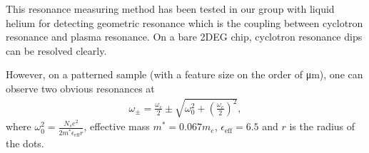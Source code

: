 \documentclass[12pt]{ruthesis}
\begin{document}
This resonance measuring method has been tested in our group with liquid helium for detecting geometric resonance which is the coupling between cyclotron resonance and plasma resonance. 
On a bare 2DEG chip, cyclotron resonance dips can be resolved clearly.


However, on a patterned sample (with a feature size on the order of \si{\micro\meter}), one can observe two obvious resonances at
\begin{align}
\omega_{\pm}=\frac{\omega_{c}}{2} \pm \sqrt{ \omega_{0}^{2}+ \left(\frac{ \omega_{c} }{2}\right)^{2}},
\end{align}
where $\displaystyle \omega_{0}^{2}=\frac{N_{s}e^{2}}{2m^{\ast}\epsilon_{\mathrm{eff}}r}$, effective mass $m^{*}=0.067m_{e}$, $\epsilon_{\mathrm{eff}}=6.5$ and $r$ is the radius of the dots. \cite{PhysRevB.28.4875}
\end{document}
